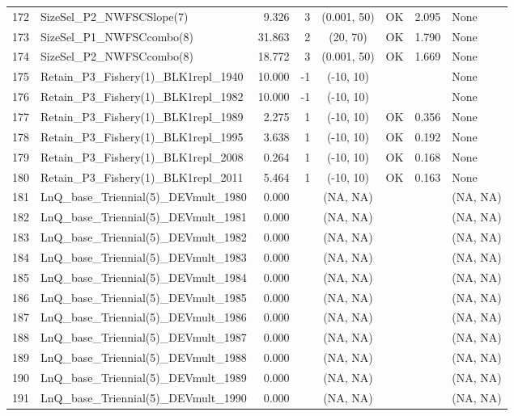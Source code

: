 \documentclass[12pt,]{article}
\begin{document}
\begin{landscape}
\begin{longtable}{rlrrcccl}
  172 & SizeSel\_P2\_NWFSCSlope(7) & 9.326 & 3 & (0.001, 50) & OK & 2.095 & None \\ 
  173 & SizeSel\_P1\_NWFSCcombo(8) & 31.863 & 2 & (20, 70) & OK & 1.790 & None \\ 
  174 & SizeSel\_P2\_NWFSCcombo(8) & 18.772 & 3 & (0.001, 50) & OK & 1.669 & None \\ 
  175 & Retain\_P3\_Fishery(1)\_BLK1repl\_1940 & 10.000 & -1 & (-10, 10) &  &  & None \\ 
  176 & Retain\_P3\_Fishery(1)\_BLK1repl\_1982 & 10.000 & -1 & (-10, 10) &  &  & None \\ 
  177 & Retain\_P3\_Fishery(1)\_BLK1repl\_1989 & 2.275 & 1 & (-10, 10) & OK & 0.356 & None \\ 
  178 & Retain\_P3\_Fishery(1)\_BLK1repl\_1995 & 3.638 & 1 & (-10, 10) & OK & 0.192 & None \\ 
  179 & Retain\_P3\_Fishery(1)\_BLK1repl\_2008 & 0.264 & 1 & (-10, 10) & OK & 0.168 & None \\ 
  180 & Retain\_P3\_Fishery(1)\_BLK1repl\_2011 & 5.464 & 1 & (-10, 10) & OK & 0.163 & None \\ 
  181 & LnQ\_base\_Triennial(5)\_DEVmult\_1980 & 0.000 &  & (NA, NA) &  &  &  (NA, NA) \\ 
  182 & LnQ\_base\_Triennial(5)\_DEVmult\_1981 & 0.000 &  & (NA, NA) &  &  &  (NA, NA) \\ 
  183 & LnQ\_base\_Triennial(5)\_DEVmult\_1982 & 0.000 &  & (NA, NA) &  &  &  (NA, NA) \\ 
  184 & LnQ\_base\_Triennial(5)\_DEVmult\_1983 & 0.000 &  & (NA, NA) &  &  &  (NA, NA) \\ 
  185 & LnQ\_base\_Triennial(5)\_DEVmult\_1984 & 0.000 &  & (NA, NA) &  &  &  (NA, NA) \\ 
  186 & LnQ\_base\_Triennial(5)\_DEVmult\_1985 & 0.000 &  & (NA, NA) &  &  &  (NA, NA) \\ 
  187 & LnQ\_base\_Triennial(5)\_DEVmult\_1986 & 0.000 &  & (NA, NA) &  &  &  (NA, NA) \\ 
  188 & LnQ\_base\_Triennial(5)\_DEVmult\_1987 & 0.000 &  & (NA, NA) &  &  &  (NA, NA) \\ 
  189 & LnQ\_base\_Triennial(5)\_DEVmult\_1988 & 0.000 &  & (NA, NA) &  &  &  (NA, NA) \\ 
  190 & LnQ\_base\_Triennial(5)\_DEVmult\_1989 & 0.000 &  & (NA, NA) &  &  &  (NA, NA) \\ 
  191 & LnQ\_base\_Triennial(5)\_DEVmult\_1990 & 0.000 &  & (NA, NA) &  &  &  (NA, NA) \\ 

\end{longtable}
\end{landscape}
\end{document}
